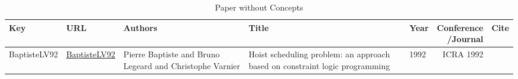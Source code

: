 {\scriptsize
\begin{longtable}{llp{5cm}p{10cm}p{3cm}rl}
\caption{Paper without Concepts}\\ \toprule
Key & URL & Authors & Title & Year & \shortstack{Conference\\/Journal} & Cite\\ \midrule
\endhead
\bottomrule
\endfoot
BaptisteLV92 & \href{https://doi.org/10.1109/ROBOT.1992.220195}{BaptisteLV92} & Pierre Baptiste and Bruno Legeard and Christophe Varnier & Hoist scheduling problem: an approach based on constraint logic programming & 1992 & ICRA 1992 & \cite{BaptisteLV92}\\\end{longtable}
}

